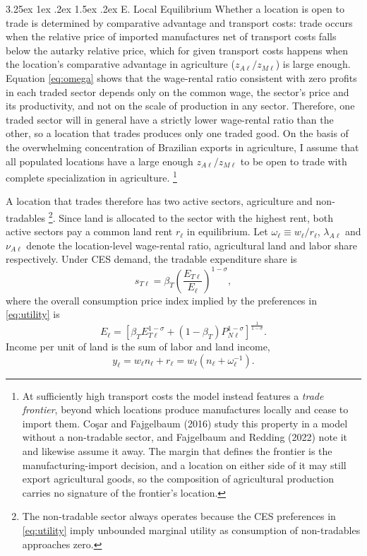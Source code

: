 \documentclass[11pt]{article}
\makeatletter
\renewcommand\paragraph{\@startsection{paragraph}{4}{\z@}%
  {3.25ex \@plus 1ex \@minus .2ex}%
  {1.5ex \@plus .2ex}%
  {\normalfont\normalsize\bfseries}}
\makeatother
\begin{document}
\paragraph{E. Local Equilibrium}
Whether a location is open to trade is determined by comparative advantage and transport costs: trade occurs when the relative price of imported manufactures net of transport costs falls below the autarky relative price, which for given transport costs happens when the location's comparative advantage in agriculture ($z_{A\ell}/z_{M\ell}$) is large enough. Equation \eqref{eq:omega} shows that the wage-rental ratio consistent with zero profits in each traded sector depends only on the common wage, the sector's price and its productivity, and not on the scale of production in any sector. Therefore, one traded sector will in general have a strictly lower wage-rental ratio than the other, so a location that trades produces only one traded good. On the basis of the overwhelming concentration of Brazilian exports in agriculture, I assume that all populated locations have a large enough $z_{A\ell}/z_{M\ell}$ to be open to trade with complete specialization in agriculture. \footnote{At sufficiently high transport costs the model instead features a \emph{trade frontier}, beyond which locations produce manufactures locally and cease to import them. Coşar and Fajgelbaum (2016) study this property in a model without a non-tradable sector, and Fajgelbaum and Redding (2022) note it and likewise assume it away. The margin that defines the frontier is the manufacturing-import decision, and a location on either side of it may still export agricultural goods, so the composition of agricultural production carries no signature of the frontier's location.}

A location that trades therefore has two active sectors, agriculture and non-tradables \footnote{The non-tradable sector always operates because the CES preferences in \eqref{eq:utility} imply unbounded marginal utility as consumption of non-tradables approaches zero.}. Since land is allocated to the sector with the highest rent, both active sectors pay a common land rent $r_\ell$ in equilibrium. Let $\omega_\ell \equiv w_\ell/r_\ell$, $\lambda_{A\ell}$ and $\nu_{A\ell}$ denote the location-level wage-rental ratio,  agricultural land and labor share respectively. Under CES demand, the tradable expenditure share is
\begin{equation}
s_{T\ell}=\beta_T\left(\frac{E_{T\ell}}{E_\ell}\right)^{1-\sigma},
\label{eq:sT_def}
\end{equation}
where the overall consumption price index implied by the preferences in \eqref{eq:utility} is
\begin{equation}
E_\ell=\left[\beta_T E_{T\ell}^{1-\sigma}+\left(1-\beta_T\right)P_{N\ell}^{1-\sigma}\right]^{\frac{1}{1-\sigma}}.
\label{eq:E}
\end{equation}
Income per unit of land is the sum of labor and land income,
\begin{equation}
y_\ell = w_\ell n_\ell + r_\ell = w_\ell\left(n_\ell+\omega_\ell^{-1}\right).
\label{eq:income}
\end{equation}
\end{document}
